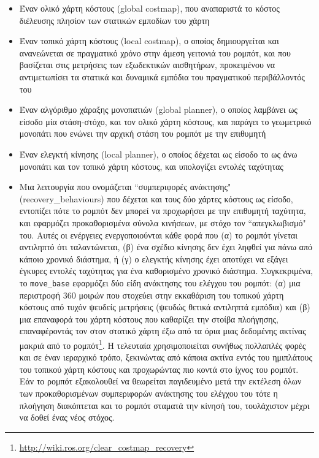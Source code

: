 \begin{itemize}
  \item Έναν ολικό χάρτη κόστους (global costmap), που αναπαριστά το κόστος
        διέλευσης πλησίον των στατικών εμποδίων του χάρτη
  \item Έναν τοπικό χάρτη κόστους (local costmap), ο οποίος δημιουργείται και
        ανανεώνεται σε πραγματικό χρόνο στην άμεση γειτονιά του ρομπότ, και που
        βασίζεται στις μετρήσεις των εξωδεκτικών αισθητήρων, προκειμένου να
        αντιμετωπίσει τα στατικά και δυναμικά εμπόδια του πραγματικού
        περιβάλλοντός του
  \item Έναν αλγόριθμο χάραξης μονοπατιών (global planner), ο οποίος λαμβάνει
        ως είσοδο μία στάση-στόχο, και τον ολικό χάρτη κόστους, και παράγει το
        γεωμετρικό μονοπάτι που ενώνει την αρχική στάση του ρομπότ με την
        επιθυμητή
  \item Έναν ελεγκτή κίνησης (local planner), ο οποίος δέχεται ως είσοδο το ως
        άνω μονοπάτι και τον τοπικό χάρτη κόστους, και υπολογίζει εντολές
        ταχύτητας
  \item Μια λειτουργία που ονομάζεται ``συμπεριφορές ανάκτησης"
        (recovery\_behaviours) που δέχεται και τους δύο χάρτες κόστους ως
        είσοδο, εντοπίζει πότε το ρομπότ δεν μπορεί να προχωρήσει με την
        επιθυμητή ταχύτητα, και εφαρμόζει προκαθορισμένα σύνολα κινήσεων, με
        στόχο τον ``απεγκλωβισμό" του. Αυτές οι ενέργειες ενεργοποιούνται κάθε
        φορά που (α) το ρομπότ γίνεται αντιληπτό ότι ταλαντώνεται, (β) ένα
        σχέδιο κίνησης δεν έχει ληφθεί για πάνω από κάποιο χρονικό διάστημα, ή
        (γ) ο ελεγκτής κίνησης έχει αποτύχει να εξάγει έγκυρες εντολές
        ταχύτητας για ένα καθορισμένο χρονικό διάστημα. Συγκεκριμένα, το
        \texttt{move\_base} εφαρμόζει δύο είδη ανάκτησης του ελέγχου του
        ρομπότ: (α) μια περιστροφή $360$ μοιρών που στοχεύει στην εκκαθάριση
        του τοπικού χάρτη κόστους από τυχόν ψευδείς μετρήσεις (ψευδώς θετικά
        αντιληπτά εμπόδια) και (β) μια επαναφορά του χάρτη κόστους που
        καθαρίζει την στοίβα πλοήγησης, επαναφέροντάς τον στον στατικό χάρτη
        έξω από τα όρια μιας δεδομένης ακτίνας μακριά από το
        ρομπότ\footnote{\url{http://wiki.ros.org/clear\_costmap\_recovery}}. Η
        τελευταία χρησιμοποιείται συνήθως πολλαπλές φορές και σε έναν ιεραρχικό
        τρόπο, ξεκινώντας από κάποια ακτίνα εντός του ημιπλάτους του τοπικού
        χάρτη κόστους και προχωρώντας πιο κοντά στο ίχνος του ρομπότ. Εάν το
        ρομπότ εξακολουθεί να θεωρείται παγιδευμένο μετά την εκτέλεση όλων των
        προκαθορισμένων συμπεριφορών ανάκτησης του ελέγχου του τότε η πλοήγηση
        διακόπτεται και το ρομπότ σταματά την κίνησή του, τουλάχιστον μέχρι να
        δοθεί ένας νέος στόχος.
\end{itemize}


